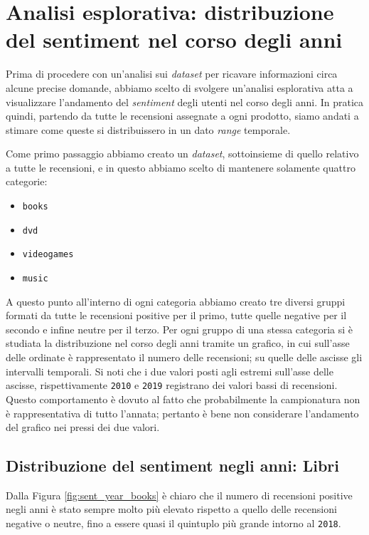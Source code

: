 	\section{Analisi esplorativa: distribuzione del sentiment nel corso degli anni}
		Prima di procedere con un'analisi sui \textit{dataset} per ricavare informazioni circa alcune precise domande, abbiamo scelto di svolgere un'analisi esplorativa atta a visualizzare l'andamento del \textit{sentiment} degli utenti nel corso degli anni. In pratica quindi, partendo da tutte le recensioni assegnate a ogni prodotto, siamo andati a stimare come queste si distribuissero in un dato \textit{range} temporale. 
		
		Come primo passaggio abbiamo creato un \textit{dataset}, sottoinsieme di quello relativo a tutte le recensioni, e in questo abbiamo scelto di mantenere solamente quattro categorie:
		\begin{itemize}
			\item \texttt{books}
			\item \texttt{dvd}
			\item \texttt{videogames}
			\item \texttt{music}
		\end{itemize}
		
		A questo punto all'interno di ogni categoria abbiamo creato tre diversi gruppi formati da tutte le recensioni positive per il primo, tutte quelle negative per il secondo e infine neutre per il terzo. Per ogni gruppo di una stessa categoria si è studiata la distribuzione nel corso degli anni tramite un grafico, in cui sull'asse delle ordinate è rappresentato il numero delle recensioni; su quelle delle ascisse gli intervalli temporali. Si noti che i due valori posti agli estremi sull'asse delle ascisse, rispettivamente \verb|2010| e \verb|2019| registrano dei valori bassi di recensioni. Questo comportamento è dovuto al fatto che probabilmente la campionatura non è rappresentativa di tutto l'annata; pertanto è bene non considerare l'andamento del grafico nei pressi dei due valori.
		
		\subsection{Distribuzione del sentiment negli anni: Libri}
			Dalla Figura \ref{fig:sent_year_books} è chiaro che il numero di recensioni positive negli anni è stato sempre molto più elevato rispetto a quello delle recensioni negative o neutre, fino a essere quasi il quintuplo più grande intorno al \verb|2018|. 
			
